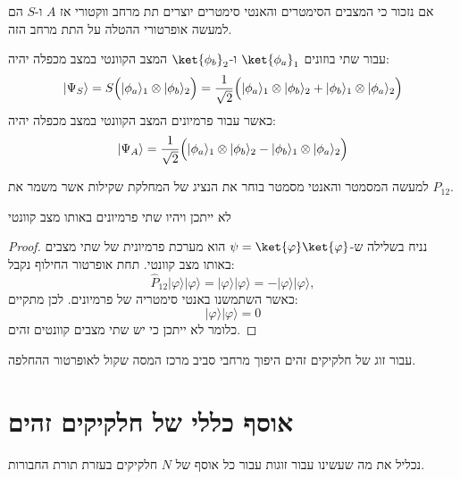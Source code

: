 \documentclass{tstextbook}
\begin{document}
\begin{remark}
אם נזכור כי המצבים הסימטרים והאנטי סימטרים יוצרים תת מרחב ווקטורי אז \(A\) ו-\(S\) הם למעשה אופרטורי ההטלה על התת מרחב הזה. 

\end{remark}
\begin{proposition}
עבור שתי בוזונים \(\ket{\phi_{a}}_{1}\) ו-\(\ket{\phi_{b}}_{2}\) המצב הקוונטי במצב מכפלה יהיה:
$$|\Psi_{S}\rangle=S{\Bigl(}|\phi_{a}\rangle_{1}\otimes|\phi_{b}\rangle_{2}{\Bigr)}={\frac{1}{\sqrt{2}}}{\Bigl(}|\phi_{a}\rangle_{1}\otimes|\phi_{b}\rangle_{2}+|\phi_{b}\rangle_{1}\otimes|\phi_{a}\rangle_{2}{\Bigr)}$$
כאשר עבור פרמיונים המצב הקוונטי במצב מכפלה יהיה:
$$|\Psi_{A}\rangle=\frac{1}{\sqrt{2}}\Bigl(|\phi_{a}\rangle_{1}\otimes|\phi_{b}\rangle_{2}-|\phi_{b}\rangle_{1}\otimes|\phi_{a}\rangle_{2}\Bigr)$$

\end{proposition}
\begin{remark}
למעשה המסמטר והאנטי מסמטר בוחר את הנציג של המחלקת שקילות אשר משמר את \(P_{12}\). 

\end{remark}
\begin{proposition}
לא ייתכן ויהיו שתי פרמיונים באותו מצב קוונטי

\end{proposition}
\begin{proof}
נניח בשלילה ש-\(\psi=\ket{\varphi}\ket{\varphi}\) הוא מערכת פרמיונית של שתי מצבים באותו מצב קוונטי. תחת אופרטור החילוף נקבל:
$$\hat{P}_{12}|\varphi\rangle|\varphi\rangle=|\varphi\rangle|\varphi\rangle=-|\varphi\rangle|\varphi\rangle,$$
כאשר השתמשנו באנטי סימטריה של פרמיונים. לכן מתקיים:
$$|\varphi\rangle|\varphi\rangle=0$$
כלומר לא ייתכן כי יש שתי מצבים קוונטים זהים. 

\end{proof}
\begin{proposition}
עבור זוג של חלקיקים זהים היפוך מרחבי סביב מרכז המסה שקול לאופרטור ההחלפה.

\end{proposition}
\section{אוסף כללי של חלקיקים זהים}

נכליל את מה שעשינו עבור זוגות עבור כל אוסף של \(N\) חלקיקים בעזרת תורת החבורות.
\end{document}
